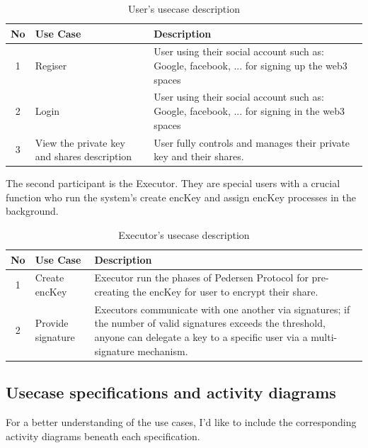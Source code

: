 \documentclass[../Main.tex]{subfiles}
\begin{document}
\begin{table}[H]
  \centering
  \begin{tabular}{|c|p{3cm}|p{9cm}|}
  \hline
  \textbf{No} & \textbf{Use Case} & \textbf{Description} \\
  \hline
  1 & Regiser & User using their social account such as: Google, facebook, ... for signing up the web3 spaces\\
  \hline
  2 & Login & User using their social account such as: Google, facebook, ... for  signing in the web3 spaces\\
  \hline
  3 & View the private key and shares description & User fully controls and manages their private key and their shares.\\
  \hline
  \end{tabular}
  \caption{User's usecase description}
  \label{user-usecase}
\end{table}

The second participant is the Executor. They are special users with a crucial function who run the system's create encKey and assign encKey processes in the background.

\begin{table}[H]
  \centering
  \begin{tabular}{|c|p{3cm}|p{9cm}|}
  \hline
  \textbf{No} & \textbf{Use Case} & \textbf{Description} \\
  \hline
  1 & Create encKey & Executor run the phases of Pedersen Protocol for pre-creating the encKey for user to encrypt their share.\\

  \hline
  2 & Provide signature & Executors communicate with one another via signatures; if the number of valid signatures exceeds the threshold, anyone can delegate a key to a specific user via a multi-signature mechanism.\\
  \hline
  \end{tabular}
  \caption{Executor's usecase description}
  \label{executor-usecase}
\end{table}
\subsection{Usecase specifications and activity diagrams}
For a better understanding of the use cases, I'd like to include the corresponding activity diagrams beneath each specification.
\end{document}
